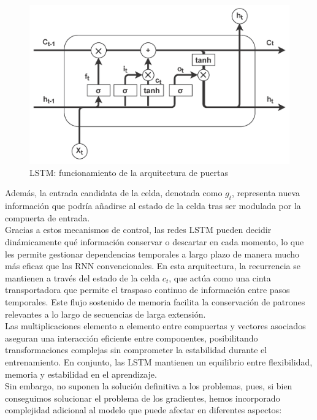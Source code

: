 \begin{figure}[H] %
	\centering
	\includegraphics[scale=1]{img/lstm}
	\caption{LSTM: funcionamiento de la arquitectura de puertas}
	\label{lstm}
\end{figure}  	


Además, la entrada candidata de la celda, denotada como $g_t$, representa nueva información que podría añadirse al estado de la celda tras ser modulada por la compuerta de entrada.\\

Gracias a estos mecanismos de control, las redes LSTM pueden decidir dinámicamente qué información conservar o descartar en cada momento, lo que les permite gestionar dependencias temporales a largo plazo de manera mucho más eficaz que las RNN convencionales. En esta arquitectura, la recurrencia se mantienen a través del estado de la celda $c_t$, que actúa como una cinta transportadora que permite el traspaso continuo de información entre pasos temporales. Este flujo sostenido de memoria facilita la conservación de patrones relevantes a lo largo de secuencias de larga extensión. \\

Las multiplicaciones elemento a elemento entre compuertas y vectores asociados aseguran una interacción eficiente entre componentes, posibilitando transformaciones complejas sin comprometer la estabilidad durante el entrenamiento. En conjunto, las LSTM mantienen un equilibrio entre flexibilidad, memoria y estabilidad en el aprendizaje.\\

Sin embargo, no suponen la solución definitiva a los problemas, pues, si bien conseguimos solucionar el problema de los gradientes, hemos incorporado complejidad adicional al modelo que puede afectar en diferentes aspectos:

